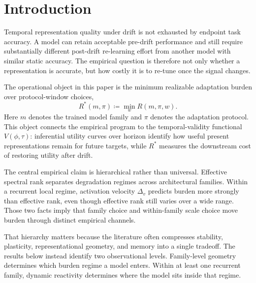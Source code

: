 \section{Introduction}

Temporal representation quality under drift is not exhausted by endpoint task
accuracy. A model can retain acceptable pre-drift performance and still require
substantially different post-drift re-learning effort from another model with
similar static accuracy. The empirical question is therefore not only whether a
representation is accurate, but how costly it is to re-tune once the signal
changes.

The operational object in this paper is the minimum realizable adaptation burden
over protocol-window choices,
\[
  R^*(m,\pi) \coloneqq \min_w R(m,\pi,w).
\]
Here $m$ denotes the trained model family and $\pi$ denotes the adaptation
protocol. This object connects the empirical program to the temporal-validity
functional $V(\phi,\tau)$: inferential utility curves over horizon identify how
useful present representations remain for future targets, while $R^*$ measures
the downstream cost of restoring utility after drift.

The central empirical claim is hierarchical rather than universal. Effective
spectral rank separates degradation regimes across architectural families.
Within a recurrent local regime, activation velocity $\Delta_v$ predicts burden
more strongly than effective rank, even though effective rank still varies over
a wide range. Those two facts imply that family choice and within-family scale
choice move burden through distinct empirical channels.

That hierarchy matters because the literature often compresses stability,
plasticity, representational geometry, and memory into a single tradeoff. The
results below instead identify two observational levels. Family-level geometry
determines which burden regime a model enters. Within at least one recurrent
family, dynamic reactivity determines where the model sits inside that regime.
